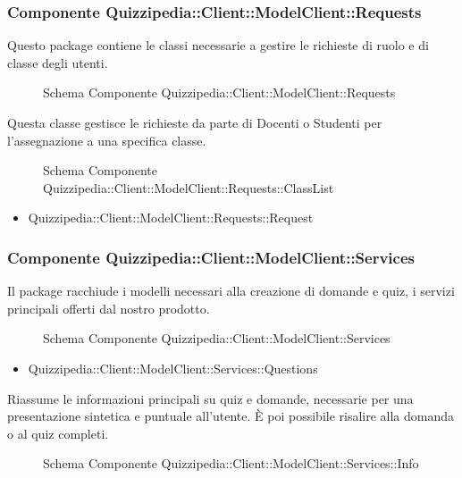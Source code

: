 \subsubsection{Componente Quizzipedia::Client::ModelClient::Requests}
Questo package contiene le classi necessarie a gestire le richieste di ruolo e di classe degli utenti.
\begin{figure}[H]
\centering
\noindent{}
\caption{Schema Componente Quizzipedia::Client::ModelClient::Requests}
\end{figure}
Questa classe gestisce le richieste da parte di Docenti o Studenti per l'assegnazione a una specifica classe.
\begin{figure}[H]
\centering
\noindent{}
\caption{Schema Componente Quizzipedia::Client::ModelClient::Requests::ClassList}
\end{figure}
\begin{itemize}
\item Quizzipedia::Client::ModelClient::Requests::Request
\end{itemize}
\subsubsection{Componente Quizzipedia::Client::ModelClient::Services}
Il package racchiude i modelli necessari alla creazione di domande e quiz, i servizi principali offerti dal nostro prodotto.
\begin{figure}[H]
\centering
\noindent{}
\caption{Schema Componente Quizzipedia::Client::ModelClient::Services}
\end{figure}
\begin{itemize}
\item Quizzipedia::Client::ModelClient::Services::Questions
\end{itemize}
Riassume le informazioni principali su quiz e domande, necessarie per una presentazione sintetica e puntuale all'utente. È poi possibile risalire alla domanda o al quiz completi.
\begin{figure}[H]
\centering
\noindent{}
\caption{Schema Componente Quizzipedia::Client::ModelClient::Services::Info}
\end{figure}
